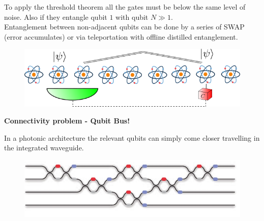 \documentclass{beamer}
\begin{document}
\begin{frame}
\begin{center}
To apply the threshold theorem all the gates must be below the same level of noise. Also if they entangle qubit $1$ with qubit $N \gg 1$.\\
Entanglement between non-adjacent qubits can be done by a series of SWAP (error accumulates) or via teleportation with offline distilled entanglement.\\

\begin{figure}[!htb]
\centering
\includegraphics[scale=.50]{immagini/teleIon.png}
\end{figure}

\begin{block}{}
\begin{center}
\textbf{Connectivity problem - Qubit Bus!}
\end{center}
\end{block}

\end{center}
\end{frame}

\begin{frame}
\begin{center}
In a photonic architecture the relevant qubits can simply come closer travelling in the integrated waveguide.

\begin{figure}[!htb]
\centering
\includegraphics[scale=.40]{immagini/come.jpg}
\end{figure}

\end{center}
\end{frame}
\end{document}
